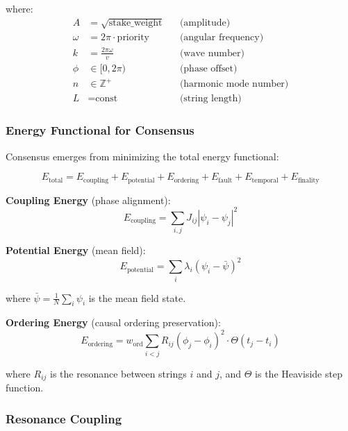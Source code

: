 \documentclass[11pt,a4paper]{article}
\begin{document}
where:
\begin{align}
A &= \sqrt{\text{stake\_weight}} &&\text{(amplitude)}\\
\omega &= 2\pi \cdot \text{priority} &&\text{(angular frequency)}\\
k &= \frac{2\pi \omega}{v} &&\text{(wave number)}\\
\phi &\in [0, 2\pi) &&\text{(phase offset)}\\
n &\in \mathbb{Z}^+ &&\text{(harmonic mode number)}\\
L &= \text{const} &&\text{(string length)}
\end{align}

\subsubsection{Energy Functional for Consensus}

Consensus emerges from minimizing the total energy functional:

\begin{equation}
E_{\text{total}} = E_{\text{coupling}} + E_{\text{potential}} + E_{\text{ordering}} + E_{\text{fault}} + E_{\text{temporal}} + E_{\text{finality}}
\label{eq:total-energy}
\end{equation}

\textbf{Coupling Energy} (phase alignment):
\begin{equation}
E_{\text{coupling}} = \sum_{i,j} J_{ij} |\psi_i - \psi_j|^2
\label{eq:coupling-energy}
\end{equation}

\textbf{Potential Energy} (mean field):
\begin{equation}
E_{\text{potential}} = \sum_{i} \lambda_i (\psi_i - \bar{\psi})^2
\label{eq:potential-energy}
\end{equation}

where $\bar{\psi} = \frac{1}{N}\sum_i \psi_i$ is the mean field state.

\textbf{Ordering Energy} (causal ordering preservation):
\begin{equation}
E_{\text{ordering}} = w_{\text{ord}} \sum_{i<j} R_{ij} (\phi_j - \phi_i)^2 \cdot \Theta(t_j - t_i)
\label{eq:ordering-energy}
\end{equation}

where $R_{ij}$ is the resonance between strings $i$ and $j$, and $\Theta$ is the Heaviside step function.

\subsubsection{Resonance Coupling}
\end{document}
